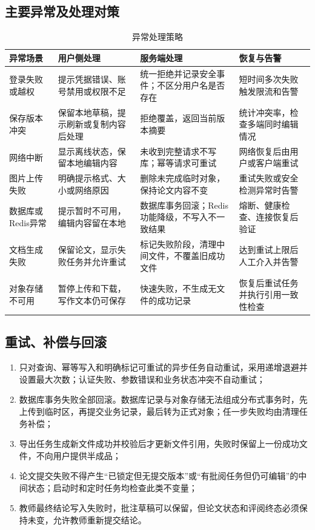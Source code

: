 \documentclass{../template/softeng}
\begin{document}
	\subsection{主要异常及处理对策}
	\begin{table}[htbp]
		\centering
		\small
		\caption{异常处理策略}
		\begin{tabular}{p{2.5cm}p{3.5cm}p{3.6cm}p{2.8cm}}
			\toprule
			异常场景 & 用户侧处理 & 服务端处理 & 恢复与告警 \\
			\midrule
			登录失败或越权 & 提示凭据错误、账号禁用或权限不足 & 统一拒绝并记录安全事件；不区分用户名是否存在 & 短时间多次失败触发限流和告警 \\
			保存版本冲突 & 保留本地草稿，提示刷新或复制内容后处理 & 拒绝覆盖，返回当前版本摘要 & 统计冲突率，检查多端同时编辑情况 \\
			网络中断 & 显示离线状态，保留本地编辑内容 & 未收到完整请求不写库；幂等请求可重试 & 网络恢复后由用户或客户端重试 \\
			图片上传失败 & 明确提示格式、大小或网络原因 & 删除未完成临时对象，保持论文内容不变 & 重试失败或安全检测异常时告警 \\
			数据库或Redis异常 & 提示暂时不可用，编辑内容留在本地 & 数据库事务回滚；Redis功能降级，不写入不一致结果 & 熔断、健康检查、连接恢复后验证 \\
			文档生成失败 & 保留论文，显示失败任务并允许重试 & 标记失败阶段，清理中间文件，不覆盖旧成功文件 & 达到重试上限后人工介入并告警 \\
			对象存储不可用 & 暂停上传和下载，写作文本仍可保存 & 快速失败，不生成无文件的成功记录 & 恢复后重试任务并执行引用一致性检查 \\
			\bottomrule
		\end{tabular}
	\end{table}
	
	\subsection{重试、补偿与回滚}
	\begin{enumerate}
		\item 只对查询、幂等写入和明确标记可重试的异步任务自动重试，采用递增退避并设置最大次数；认证失败、参数错误和业务状态冲突不自动重试；
		\item 数据库事务失败全部回滚。数据库记录与对象存储无法组成分布式事务时，先上传到临时区，再提交业务记录，最后转为正式对象；任一步失败均由清理任务补偿；
		\item 导出任务生成新文件成功并校验后才更新文件引用，失败时保留上一份成功文件，不向用户提供半成品；
		\item 论文提交失败不得产生“已锁定但无提交版本”或“有批阅任务但仍可编辑”的中间状态；启动时和定时任务均检查此类不变量；
		\item 教师最终结论写入失败时，批注草稿可以保留，但论文状态和评阅终态必须保持未变，允许教师重新提交结论。
	\end{enumerate}
	
\end{document}
